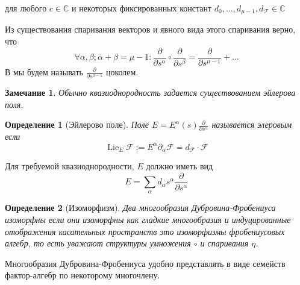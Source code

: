 \documentclass[a4paper, 10pt]{article}
\theoremstyle{plain}
\newtheorem{defin}{Определение}
\newtheorem*{rem}{Замечание}
\newcommand{\defeq}{:=}
\newcommand{\tang}[1][\hspace{0pt}]{\frac{\partial }{\partial #1}}
\begin{document}
для любого \(c \in \mathbb{C}\) и некоторых фиксированных констант \(d_0, \dots, d_{\mu-1}, d_\mathcal{F} \in \mathbb{C}\)\par
Из существования спаривания векторов и явного вида этого спаривания верно, что \[\forall \alpha, \beta; \alpha + \beta = \mu - 1:\tang[s^\alpha]\circ \tang[s^\beta] = \tang[s^{\mu-1}] + \dots\]
В мы будем называть \(\tang[s^{\mu-1}]\) цоколем.
\par
\begin{rem}
    Обычно квазиоднородность задается существованием эйлерова поля.\par
\end{rem}
\begin{defin}[Эйлерово поле]
    Поле \(E = E^\alpha(s)\tang[s^\alpha]\) называется элеровым если \[\operatorname{Lie}_E \mathcal{F} \defeq E^\alpha \partial_\alpha \mathcal{F} = d_\mathcal{F} \cdot \mathcal{F}\]
\end{defin}
Для требуемой квазиоднородности, \(E\) должно иметь вид \[E = \sum_\alpha d_\alpha s^\alpha\tang[s^\alpha]\]
\begin{defin}[Изоморфизм]
    Два многообразия Дубровина-Фробениуса изоморфны если они изоморфны как гладкие многообразия и индуцированные отображения касательных пространств это изоморфизмы фробениусовых алгебр, то есть уважают структуры умножения \(\circ\) и спаривания \(\eta\).
\end{defin}
Многообразия Дубровина-Фробениуса удобно представлять в виде семейств фактор-алгебр по некоторому многочлену.
\end{document}
